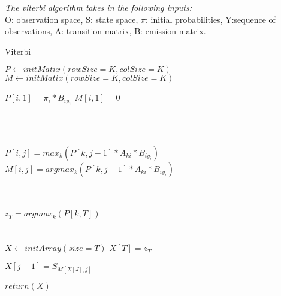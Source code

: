 \documentclass[]{article}
\begin{document}
	\textit{The viterbi algorithm takes in the following inputs:} \\ O: observation space, S: state space, $\pi$: initial probabilities, Y:sequence of observations, A: transition matrix, B: emission matrix. 
	
	
	\begin{algorithm}
		\caption{Viterbi}
		\begin{algorithmic}[1]
            
            
            \State $P \gets initMatix(rowSize=K, colSize=K)$ 
            \State $M \gets initMatix(rowSize=K, colSize=K)$ 
            
            
             
                \State $P[i, 1] = \pi_i * B_{iy_1}$
                \State $M[i, 1] = 0$
            \EndFor
            
            \\ \\
                
                
                    \State $P[i, j] = max_k(P[k, j-1] * A_{ki} * B_{iy_i})$
                    \State $M[i, j] = argmax_k(P[k, j-1] * A_{ki} * B_{iy_i})$
                
                \EndFor
            
            \EndFor
           
            \\ \\
            
            \State $z_T = argmax_k (P[k, T])$
            \\ \\
            \\
            \State $X \gets initArray(size=T)$
            \State $X[T] = z_T$
            
                \State $X[j-1] = S_{M[X[J], j]}$
            
            \EndFor
            
            \State $return(X)$
            
            \EndProcedure
            
		\end{algorithmic}
	\end{algorithm}
	
\end{document}
